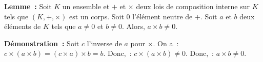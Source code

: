 \medskip

\noindent\textbf{Lemme :} Soit $K$ un ensemble et $+$ et $\times$ deux lois de composition interne sur $K$ tels que $(K, +, \times)$ est un corps. 
    Soit $0$ l'élément neutre de $+$.
    Soit $a$ et $b$ deux éléments de $K$ tels que $a \neq 0$ et $b \neq 0$.
    Alors, $a \times b \neq 0$.

\medskip

\noindent\textbf{Démonstration :} Soit $c$ l'inverse de $a$ pour $\times$.
    On a : $c \times (a \times b) = (c \times a) \times b = b$.
    Donc, : $c \times (a \times b) \neq 0$.
    Donc, : $a \times b \neq 0$.

    \done
